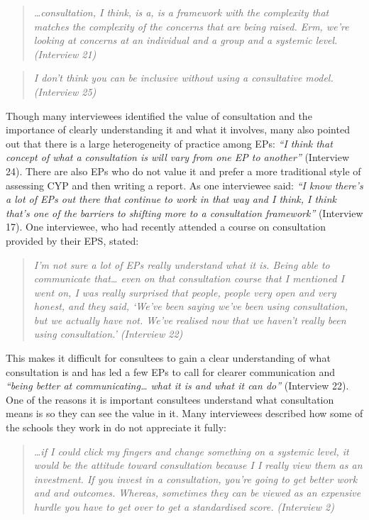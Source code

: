 \documentclass[
  english,
  man]{apa7}
\begin{document}
\begin{quote}
\emph{\ldots consultation, I think, is a, is a framework with the complexity that
matches the complexity of the concerns that are being raised. Erm,
we're looking at concerns at an individual and a group and a systemic
level. (Interview 21)}
\end{quote}

\begin{quote}
\emph{I don't think you can be inclusive without using a consultative
model. (Interview 25)}
\end{quote}

Though many interviewees identified the value of consultation and the importance of clearly understanding it and what it involves, many also pointed out that there is a large heterogeneity of practice among EPs: \emph{``I think that concept of what a consultation is will vary from one EP to another''} (Interview 24). There are also EPs who do not value it and prefer a more traditional style of assessing CYP and then writing a report. As one interviewee said: \emph{``I know there's a lot of EPs out there that continue to work in that way and I think, I think that's one of the barriers to shifting more to a consultation framework''} (Interview 17). One interviewee, who had recently attended a course on consultation provided by their EPS, stated:

\begin{quote}
\emph{I'm not sure a lot of EPs really understand what it is. Being able to
communicate that\ldots{} even on that consultation course that I mentioned
I went on, I was really surprised that people, people very open and
very honest, and they said, `We've been saying we've been using
consultation, but we actually have not. We've realised now that we
haven't really been using consultation.' (Interview 22)}
\end{quote}

This makes it difficult for consultees to gain a clear understanding of what consultation is and has led a few EPs to call for clearer communication and \emph{``being better at communicating\ldots{} what it is and what it can do''} (Interview 22). One of the reasons it is important consultees understand what consultation means is so they can see the value in it. Many interviewees described how some of the schools they work in do not appreciate it fully:

\begin{quote}
\emph{\ldots if I could click my fingers and change something on a systemic level,
it would be the attitude toward consultation because I I really view
them as an investment. If you invest in a consultation, you're going
to get better work and and outcomes. Whereas, sometimes they can be
viewed as an expensive hurdle you have to get over to get a
standardised score. (Interview 2)}
\end{quote}
\end{document}
